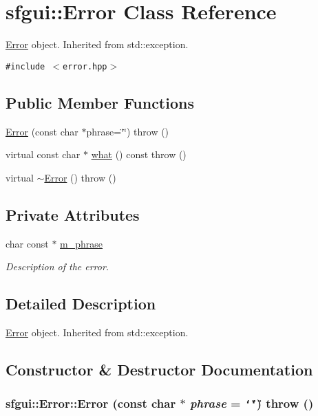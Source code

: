 \hypertarget{classsfgui_1_1Error}{
\section{sfgui::Error Class Reference}
\label{classsfgui_1_1Error}
}
\hyperlink{classsfgui_1_1Error}{Error} object. Inherited from std::exception.  


{\tt \#include $<$error.hpp$>$}

\subsection*{Public Member Functions}
\begin{CompactItemize}
\item 
\hyperlink{classsfgui_1_1Error_d402c73e8bfc7b7883700ce2d6c0b7b1}{Error} (const char $\ast$phrase=\char`\"{}\char`\"{})  throw ()
\item 
virtual const char $\ast$ \hyperlink{classsfgui_1_1Error_7e169ba3f26b7585d292bec5a253b8ec}{what} () const   throw ()
\item 
virtual \hyperlink{classsfgui_1_1Error_fb2a732879909cf082f89002c0f03981}{$\sim$Error} ()  throw ()
\end{CompactItemize}
\subsection*{Private Attributes}
\begin{CompactItemize}
\item 
char const $\ast$ \hyperlink{classsfgui_1_1Error_2acba2e2ab334cd94bf392f26f9207ff}{m\_\-phrase}
\begin{CompactList}\small\item\em Description of the error. \item\end{CompactList}\end{CompactItemize}


\subsection{Detailed Description}
\hyperlink{classsfgui_1_1Error}{Error} object. Inherited from std::exception. 

\subsection{Constructor \& Destructor Documentation}
\hypertarget{classsfgui_1_1Error_d402c73e8bfc7b7883700ce2d6c0b7b1}{
\subsubsection[Error]{\setlength{\rightskip}{0pt plus 5cm}sfgui::Error::Error (const char $\ast$ {\em phrase} = {\tt \char`\"{}\char`\"{}})  throw ()}}
\label{classsfgui_1_1Error_d402c73e8bfc7b7883700ce2d6c0b7b1}


